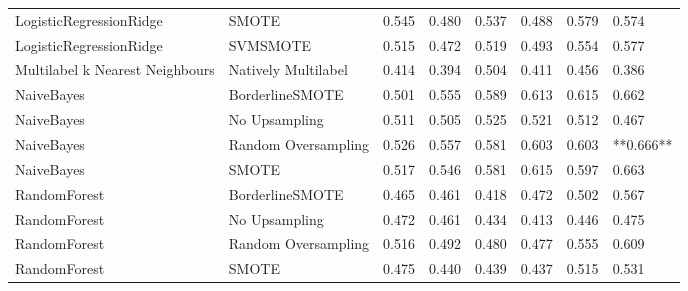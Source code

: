 \begin{tabular}{llllllll}
        LogisticRegressionRidge &                         SMOTE & 0.545 &                     0.480 &                 0.537 &                  0.488 &                                   0.579 &     0.574 \\
        LogisticRegressionRidge &                      SVMSMOTE & 0.515 &                     0.472 &                 0.519 &                  0.493 &                                   0.554 &     0.577 \\
Multilabel k Nearest Neighbours &           Natively Multilabel & 0.414 &                     0.394 &                 0.504 &                  0.411 &                                   0.456 &     0.386 \\
                     NaiveBayes &               BorderlineSMOTE & 0.501 &                     0.555 &                 0.589 &                  0.613 &                                   0.615 &     0.662 \\
                     NaiveBayes &                 No Upsampling & 0.511 &                     0.505 &                 0.525 &                  0.521 &                                   0.512 &     0.467 \\
                     NaiveBayes &           Random Oversampling & 0.526 &                     0.557 &                 0.581 &                  0.603 &                                   0.603 & **0.666** \\
                     NaiveBayes &                         SMOTE & 0.517 &                     0.546 &                 0.581 &                  0.615 &                                   0.597 &     0.663 \\
                   RandomForest &               BorderlineSMOTE & 0.465 &                     0.461 &                 0.418 &                  0.472 &                                   0.502 &     0.567 \\
                   RandomForest &                 No Upsampling & 0.472 &                     0.461 &                 0.434 &                  0.413 &                                   0.446 &     0.475 \\
                   RandomForest &           Random Oversampling & 0.516 &                     0.492 &                 0.480 &                  0.477 &                                   0.555 &     0.609 \\
                   RandomForest &                         SMOTE & 0.475 &                     0.440 &                 0.439 &                  0.437 &                                   0.515 &     0.531 \\

\end{tabular}

